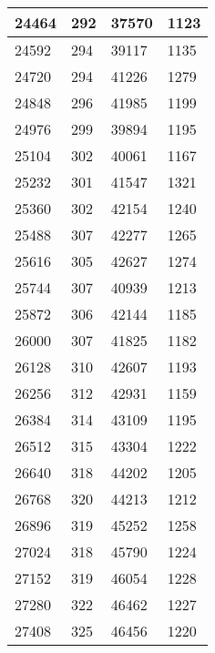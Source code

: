 \begin{longtable}{|l|l|l|l|}
		24464 & 292         & 37570           & 1123             \\ \hline
		24592 & 294         & 39117           & 1135             \\ \hline
		24720 & 294         & 41226           & 1279             \\ \hline
		24848 & 296         & 41985           & 1199             \\ \hline
		24976 & 299         & 39894           & 1195             \\ \hline
		25104 & 302         & 40061           & 1167             \\ \hline
		25232 & 301         & 41547           & 1321             \\ \hline
		25360 & 302         & 42154           & 1240             \\ \hline
		25488 & 307         & 42277           & 1265             \\ \hline
		25616 & 305         & 42627           & 1274             \\ \hline
		25744 & 307         & 40939           & 1213             \\ \hline
		25872 & 306         & 42144           & 1185             \\ \hline
		26000 & 307         & 41825           & 1182             \\ \hline
		26128 & 310         & 42607           & 1193             \\ \hline
		26256 & 312         & 42931           & 1159             \\ \hline
		26384 & 314         & 43109           & 1195             \\ \hline
		26512 & 315         & 43304           & 1222             \\ \hline
		26640 & 318         & 44202           & 1205             \\ \hline
		26768 & 320         & 44213           & 1212             \\ \hline
		26896 & 319         & 45252           & 1258             \\ \hline
		27024 & 318         & 45790           & 1224             \\ \hline
		27152 & 319         & 46054           & 1228             \\ \hline
		27280 & 322         & 46462           & 1227             \\ \hline
		27408 & 325         & 46456           & 1220             \\ \hline

\end{longtable}
